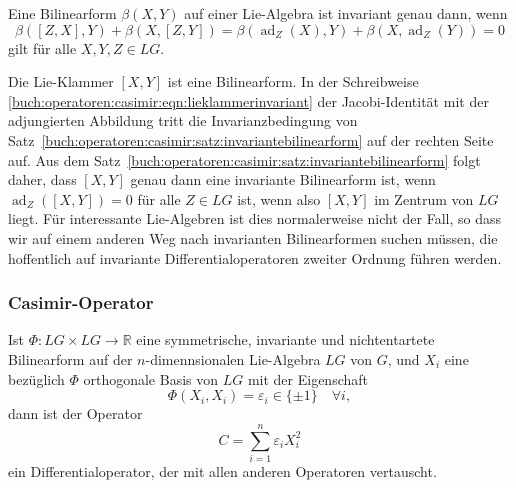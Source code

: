 \begin{satz}
\label{buch:operatoren:casimir:satz:invariantebilinearform}
Eine Bilinearform $\beta(X,Y)$ auf einer Lie-Algebra ist invariant
genau dann, wenn
\[
\beta([Z,X],Y) + \beta(X,[Z,Y])
=
\beta(\operatorname{ad}_Z(X),Y)
+
\beta(X,\operatorname{ad}_Z(Y))
=
0
\]
gilt für alle $X,Y,Z\in LG$.
\end{satz}

Die Lie-Klammer $[X,Y]$ ist eine Bilinearform.
In der Schreibweise
\eqref{buch:operatoren:casimir:eqn:lieklammerinvariant}
der Jacobi-Identität mit der adjungierten Abbildung tritt
die Invarianzbedingung von
Satz~\ref{buch:operatoren:casimir:satz:invariantebilinearform}
auf der rechten Seite auf.
Aus dem Satz~\ref{buch:operatoren:casimir:satz:invariantebilinearform}
folgt daher, dass $[X,Y]$ genau dann eine invariante
Bilinearform ist, wenn $\operatorname{ad}_Z([X,Y])=0$ für alle $Z\in LG$
ist, wenn also $[X,Y]$ im Zentrum von $LG$ liegt.
Für interessante Lie-Algebren ist dies normalerweise nicht der Fall,
so dass wir auf einem anderen Weg nach invarianten Bilinearformen
suchen müssen, die hoffentlich auf invariante Differentialoperatoren
zweiter Ordnung führen werden.

%
%
\subsubsection{Casimir-Operator}

\begin{satz}
Ist $\Phi\colon LG\times LG\to\mathbb{R}$ eine symmetrische, invariante
und nichtentartete Bilinearform auf der $n$-dimennsionalen Lie-Algebra
$LG$ von $G$, und $X_i$ eine bezüglich $\Phi$
orthogonale Basis von $LG$ mit der Eigenschaft
\[
\Phi(X_i,X_i) = \varepsilon_i \in \{\pm 1\}\quad\forall i,
\]
dann ist der Operator
\[
C
=
\sum_{i=1}^n \varepsilon_i X_i^2
\]
ein Differentialoperator, der mit allen anderen Operatoren vertauscht.
\end{satz}


